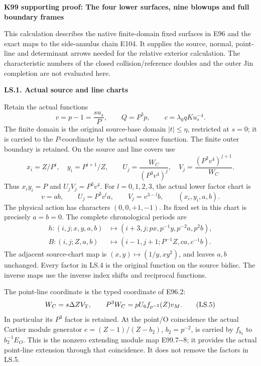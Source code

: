 \par\bigskip\noindent\textbf{K99 supporting proof: The four lower surfaces, nine blowups and full boundary frames}\par\nobreak
This calculation describes the native finite-domain fixed surfaces in
E96 and the exact maps to the side-annulus chain E104. It supplies the
source, normal, point-line and determinant arrows needed for the relative
exterior calculation. The characteristic numbers of the closed
collision/reference doubles and the outer Jin completion are not
evaluated here.

\par

\medskip\noindent\textbf{LS.1. Actual source and line charts}

\par\nobreak

Retain the actual functions
\[
 v=p-1=\frac{s u_s}{P},\qquad Q=P^3p,
 \qquad c=\lambda _0qK u_s^{-4}.
 \tag{LS.1}
\]
The finite domain is the original source-base domain
\(|t|\leq\eta\), restricted at \(s=0\); it is carried to the
\(P\)-coordinate by the actual source function. The finite outer
boundary is retained. On the source and line covers use
\[
 x_i=Z/P^i,\quad y_i=P^{i+1}/Z,\qquad
 U_j=\frac{W_C}{(P^3v^4)^j},\quad
 V_j=\frac{(P^3v^4)^{j+1}}{W_C}.
 \tag{LS.2}
\]
Thus \(x_i y_i=P\) and \(U_jV_j=P^3v^4\). For
\(l=0,1,2,3\), the actual lower factor chart is
\[
 v=ab,\qquad U_j=P^3v^l a,\qquad
 V_j=v^{3-l}b,\qquad (x_i,y_i,a,b).
 \tag{LS.3}
\]
The physical action has characters \((0,0,+1,-1)\).
Its fixed set in this chart is precisely \(a=b=0\).
The complete chronological periods are
\[
\begin{aligned}
 h:(i,j;x,y,a,b)&\longmapsto
 (i+3,j;px,p^{-1}y,p^{-2}a,p^2b),\\
 B:(i,j;Z,a,b)&\longmapsto
 (i-1,j+1;P^{-1}Z,ca,c^{-1}b).
\end{aligned}
\tag{LS.4}
\]
The adjacent source-chart map is
\((x,y)\mapsto(1/y,xy^2)\), and leaves \(a,b\) unchanged.
Every factor in LS.4 is the original function on the source bidisc.
The inverse maps use the inverse index shifts and reciprocal functions.

The point-line coordinate is the typed coordinate of E96.2:
\[
 W_C=s\Delta ZV_{\rm T},\qquad
 P^3W_C=pU_6 f_{p^{-2}}(Z)v_M.
 \tag{LS.5}
\]
In particular its \(P^3\) factor is retained. At the point/O
coincidence the actual Cartier module generator
\(e=(Z-1)/(Z-b_2)\), \(b_2=p^{-2}\), is carried by
\(f_{b_2}\) to \(b_2^{-1}E_O\). This is the nonzero extending
module map E99.7-\/-8; it provides the actual point-line extension
through that coincidence. It does not remove the factors in LS.5.

